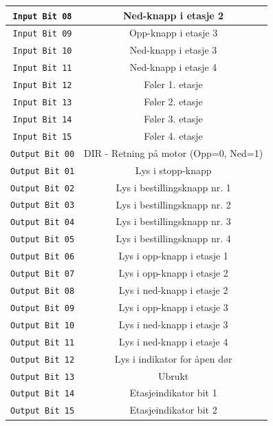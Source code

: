 \begin{alphasection}
\begin{center}
{\begin{tabular}{|c| c|}
 \verb|Input Bit 08| & Ned-knapp i etasje 2 \\ 
 \hline
 \verb|Input Bit 09| & Opp-knapp i etasje 3 \\ 
 \hline
 \verb|Input Bit 10| & Ned-knapp i etasje 3\\ 
 \hline
 \verb|Input Bit 11| & Ned-knapp i etasje 4 \\ 
 \hline
 \verb|Input Bit 12| & Føler 1. etasje \\ 
 \hline
 \verb|Input Bit 13| & Føler 2. etasje \\ 
 \hline
 \verb|Input Bit 14| & Føler 3. etasje \\ 
 \hline
 \verb|Input Bit 15| & Føler 4. etasje \\ 
 \toprule
 
 \verb|Output Bit 00| & DIR - Retning på motor (Opp=0, Ned=1) \\ 
 \hline
 \verb|Output Bit 01| & Lys i stopp-knapp \\ 
 \hline
 \verb|Output Bit 02| & Lys i bestillingsknapp nr. 1 \\ 
 \hline
 \verb|Output Bit 03| & Lys i bestillingsknapp nr. 2 \\ 
 \hline
 \verb|Output Bit 04| & Lys i bestillingsknapp nr. 3\\ 
 \hline
 \verb|Output Bit 05| & Lys i bestillingsknapp nr. 4\\ 
 \hline
 \verb|Output Bit 06| & Lys i opp-knapp i etasje 1 \\ 
 \hline
 \verb|Output Bit 07| & Lys i opp-knapp i etasje 2 \\ 
 \toprule
 
 \verb|Output Bit 08| & Lys i ned-knapp i etasje 2 \\ 
 \hline
 \verb|Output Bit 09| &Lys i opp-knapp i etasje 3 \\ 
 \hline
 \verb|Output Bit 10| & Lys i ned-knapp i etasje 3\\ 
 \hline
 \verb|Output Bit 11| & Lys i ned-knapp i etasje 4\\ 
 \hline
 \verb|Output Bit 12| & Lys i indikator for åpen dør \\ 
 \hline
 \verb|Output Bit 13| & Ubrukt \\ 
 \hline
 \verb|Output Bit 14| &Etasjeindikator bit 1 \\ 
 \hline
 \verb|Output Bit 15| &Etasjeindikator bit 2 \\ 
 \toprule
\end{tabular}}
\end{center}


\end{alphasection}
